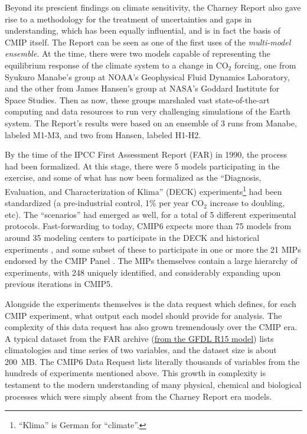\documentclass[gmd,manuscript]{copernicus}
\begin{document}
Beyond its prescient findings on climate sensitivity, the Charney
Report also gave rise to a methodology for the treatment of
uncertainties and gaps in understanding, which has been equally
influential, and is in fact the basis of CMIP itself. The Report can
be seen as one of the first uses of the \emph{multi-model ensemble}.
At the time, there were two models capable of representing the
equilibrium response of the climate system to a change in CO$_2$
forcing, one from Syukuro Manabe's group at NOAA's Geophysical Fluid
Dynamics Laboratory, and the other from James Hansen's group at NASA's
Goddard Institute for Space Studies. Then as now, these groups
marshaled vast state-of-the-art computing and data resources to run
very challenging simulations of the Earth system. The Report's results
were based on an ensemble of 3 runs from Manabe, labeled M1-M3, and
two from Hansen, labeled H1-H2.

By the time of the IPCC First Assessment Report (FAR) in 1990, the
process had been formalized. At this stage, there were 5 models
participating in the exercise, and some of what has now been
formalized as the ``Diagnosis, Evaluation, and Characterization of
Klima'' (DECK) experiments\footnote{``Klima'' is German for
  ``climate''.} had been standardized (a pre-industrial control, 1\%
per year CO$_2$ increase to doubling, etc). The ``scenarios'' had
emerged as well, for a total of 5 different experimental protocols.
Fast-forwarding to today, CMIP6 expects more than 75 models from
around 35 modeling centers \citep[in 14 countries, a stark contrast
to the US monopoly in][]{ref:charneyetal1979} to participate in the
DECK and historical experiments \citep[Table~2
of][]{ref:eyringetal2016a}, and some subset of these to participate in
one or more the 21 MIPs endorsed by the CMIP Panel \citep[Table~3
of][]{ref:eyringetal2016a}. The MIPs themselves contain a large
hierarchy of experiments, with 248 uniquely identified, and
considerably expanding upon previous iterations in CMIP5.

Alongside the experiments themselves is the data request which
defines, for each CMIP experiment, what output each model should
provide for analysis. The complexity of this data request has also
grown tremendously over the CMIP era. A typical dataset from the FAR
archive (\href{https://goo.gl/M1WSJy}{from the GFDL R15 model}) lists
climatologies and time series of two variables, and the dataset size
is about 200~MB. The CMIP6 Data Request \cite{ref:juckesetal2015}
lists literally thousands of variables from the hundreds of
experiments mentioned above. This growth in complexity is testament to
the modern understanding of many physical, chemical and biological
processes which were simply absent from the Charney Report era models.
\end{document}
